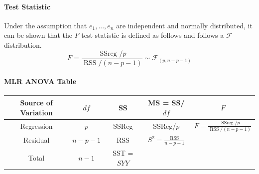 \documentclass[10pt]{article}
\begin{document}
\paragraph{Test Statistic} Under the assumption that $e_1,...,e_n$ are independent and normally distributed, it can be shown that the $F$ test statistic is defined as follows and follows a $\mathcal{F}$ distribution.
\begin{equation*}
    F=\frac{\text { SSreg } / p}{\operatorname{RSS} /(n-p-1)} {\sim} \mathcal{F}_{(p, n-p-1)}
\end{equation*}
\paragraph{MLR ANOVA Table}
\begin{center}
    \begin{tabular}{|c||c|c|c|c|}
        \hline
        Source of Variation & $df$ & SS & MS = SS/$df$ & $F$ \\ \hline
        Regression & $p$ & SSReg & SSReg/$p$ & $F=\frac{\text { SSreg } / p}{\operatorname{RSS} /(n-p-1)}$ \\ \hline
        Residual & $n-p-1$ & RSS & $S^2 = \frac{\text{RSS}}{n-p-1}$ & \\ \hline
        Total & $n-1$ & SST = $SYY$ & & \\ \hline
    \end{tabular}
\end{center}
\end{document}
